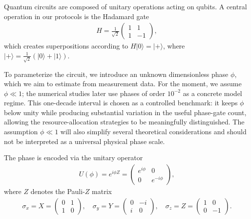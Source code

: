 Quantum circuits are composed of unitary operations acting on qubits. A central operation in our protocols is the Hadamard gate \cite{nielsenQuantumComputationQuantum2012}
\begin{align}
    H = \frac{1}{\sqrt{2}} 
    \begin{pmatrix}
        1 & 1 \\
        1 & -1
    \end{pmatrix},
\end{align}
which creates superpositions according to $H\lvert 0 \rangle = \lvert + \rangle$, where $\lvert + \rangle = \frac{1}{\sqrt{2}}(\lvert 0 \rangle + \lvert 1 \rangle)$.

To parameterize the circuit, we introduce an unknown dimensionless phase $\phi$, which we aim to estimate from measurement data.
For the moment, we assume $\phi \ll 1$; the numerical studies later use phases of order $10^{-2}$ as a concrete model regime.
This one-decade interval is chosen as a controlled benchmark: it keeps \(\phi\) below unity 
while producing substantial variation in the useful phase-gate count, 
allowing the resource-allocation strategies to be meaningfully distinguished. 
The assumption $\phi \ll 1$ will also simplify several theoretical considerations and 
should not be interpreted as a universal physical phase scale.

The phase is encoded via the unitary operator
\begin{align}
    U(\phi) = e^{i \phi Z} =
    \begin{pmatrix}
        e^{i \phi} & 0 \\
        0 & e^{-i\phi}
    \end{pmatrix},
\end{align}
where $Z$ denotes the Pauli-$Z$ matrix \cite{pauliZurQuantenmechanikMagnetischen1927}
\begin{align}
    \sigma_x = X =
    \begin{pmatrix}
        0 & 1 \\
        1 & 0
    \end{pmatrix},
    \quad
    \sigma_y = Y =
    \begin{pmatrix}
        0 & -i \\
        i & 0
    \end{pmatrix},
    \quad
        \sigma_z = Z =
    \begin{pmatrix}
        1 & 0 \\
        0 & -1
    \end{pmatrix}.
\end{align}

